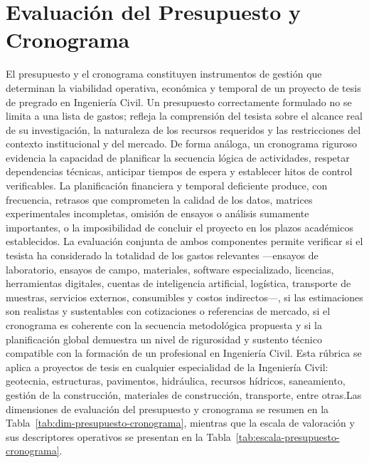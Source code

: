 \clearpage
\section{Evaluación del Presupuesto y Cronograma}

{\footnotesize\setlength{\baselineskip}{0.85\baselineskip}
El presupuesto y el cronograma constituyen instrumentos de gestión que determinan la viabilidad operativa, económica y temporal de un proyecto de tesis de pregrado en Ingeniería Civil. Un presupuesto correctamente formulado no se limita a una lista de gastos; refleja la comprensión del tesista sobre el alcance real de su investigación, la naturaleza de los recursos requeridos y las restricciones del contexto institucional y del mercado. De forma análoga, un cronograma riguroso evidencia la capacidad de planificar la secuencia lógica de actividades, respetar dependencias técnicas, anticipar tiempos de espera y establecer hitos de control verificables. La planificación financiera y temporal deficiente produce, con frecuencia, retrasos que comprometen la calidad de los datos, matrices experimentales incompletas, omisión de ensayos o análisis sumamente importantes, o la imposibilidad de concluir el proyecto en los plazos académicos establecidos. La evaluación conjunta de ambos componentes permite verificar si el tesista ha considerado la totalidad de los gastos relevantes ---ensayos de laboratorio, ensayos de campo, materiales, software especializado, licencias, herramientas digitales, cuentas de inteligencia artificial, logística, transporte de muestras, servicios externos, consumibles y costos indirectos---, si las estimaciones son realistas y sustentables con cotizaciones o referencias de mercado, si el cronograma es coherente con la secuencia metodológica propuesta y si la planificación global demuestra un nivel de rigurosidad y sustento técnico compatible con la formación de un profesional en Ingeniería Civil. Esta rúbrica se aplica a proyectos de tesis en cualquier especialidad de la Ingeniería Civil: geotecnia, estructuras, pavimentos, hidráulica, recursos hídricos, saneamiento, gestión de la construcción, materiales de construcción, transporte, entre otras.Las dimensiones de evaluación del presupuesto y cronograma se resumen en la Tabla~\ref{tab:dim-presupuesto-cronograma}, mientras que la escala de valoración y sus descriptores operativos se presentan en la Tabla~\ref{tab:escala-presupuesto-cronograma}. \par
}

